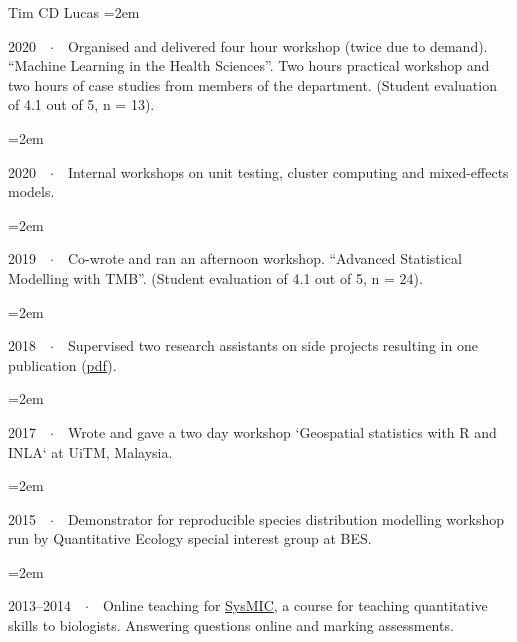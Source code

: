 \documentclass{scrartcl}
\newcommand{\Description}[1]{\hangindent=2em\hangafter=0\noindent\raggedright\footnotesize{#1}\par\normalsize\vspace{1em}} %
\begin{document}
\begin{cv}{Tim {\Large CD} Lucas}
\Description{2020\ \ $\cdotp$\ \ Organised and delivered four hour workshop (twice due to demand).  ``Machine Learning in the Health Sciences''. Two hours practical workshop and two hours of case studies from members of the department. (Student evaluation of 4.1 out of 5, n = 13).}
\vspace{-0.5em} %

\Description{2020\ \ $\cdotp$\ \ Internal workshops on unit testing, cluster computing and mixed-effects models.}
\vspace{-0.5em} %

\Description{2019\ \ $\cdotp$\ \ Co-wrote and ran an afternoon workshop. ``Advanced Statistical Modelling with TMB''. (Student evaluation of 4.1 out of 5, n = 24).}
\vspace{-0.5em} %


\Description{2018\ \ $\cdotp$\ \ Supervised two research assistants on side projects resulting in one publication (\href{https://malariajournal.biomedcentral.com/track/pdf/10.1186/s12936-018-2500-5}{pdf}).}
\vspace{-0.5em} %

\Description{2017\ \ $\cdotp$\ \ Wrote and gave a two day workshop `Geospatial statistics with R and INLA` at UiTM, Malaysia.}
\vspace{-0.5em} %


\Description{2015\ \ $\cdotp$\ \ Demonstrator for reproducible species distribution modelling workshop run by Quantitative Ecology special interest group at BES.}
\vspace{-0.5em} %

\Description{2013--2014\ \ $\cdotp$\ \ Online teaching for \href{http://sysmic.ac.uk/home.html}{{\footnotesize SysMIC}}, a course for teaching quantitative skills to biologists. Answering questions online and marking assessments.}

\vspace{1em} %





\end{cv}
\end{document}
